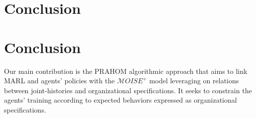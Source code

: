 \documentclass[conference]{IEEEtran}
\newcounter{relation}
\begin{document}
\section{Conclusion}\label{sec:conclusion}






\section{Conclusion}

Our main contribution is the PRAHOM algorithmic approach that aims to link MARL and agents' policies with the $\mathcal{M}OISE^+$ model leveraging on relations between joint-histories and organizational specifications. It seeks to constrain the agents' training according to expected behaviors expressed as organizational specifications.
\end{document}
